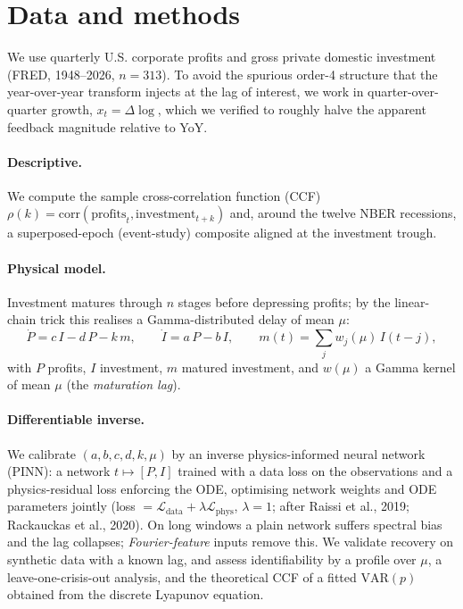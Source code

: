 \documentclass[11pt]{article}
\begin{document}
\section{Data and methods}
We use quarterly U.S. corporate profits and gross private domestic investment (FRED, 1948--2026,
$n=313$). To avoid the spurious order-4 structure that the year-over-year transform injects at the
lag of interest, we work in quarter-over-quarter growth, $x_t=\Delta\log$, which we verified to
roughly halve the apparent feedback magnitude relative to YoY.

\paragraph{Descriptive.} We compute the sample cross-correlation function (CCF)
$\rho(k)=\mathrm{corr}(\text{profits}_t,\text{investment}_{t+k})$ and, around the twelve NBER
recessions, a superposed-epoch (event-study) composite aligned at the investment trough.

\paragraph{Physical model.} Investment matures through $n$ stages before depressing profits; by
the linear-chain trick this realises a Gamma-distributed delay of mean $\mu$:
\begin{equation}
\dot P = c\,I - d\,P - k\,m,\qquad
\dot I = a\,P - b\,I,\qquad
m(t)=\textstyle\sum_j w_j(\mu)\,I(t-j),
\end{equation}
with $P$ profits, $I$ investment, $m$ matured investment, and $w(\mu)$ a Gamma kernel of mean
$\mu$ (the \emph{maturation lag}).

\paragraph{Differentiable inverse.} We calibrate $(a,b,c,d,k,\mu)$ by an inverse
physics-informed neural network (PINN): a network $t\mapsto[P,I]$ trained with a data loss on the
observations and a physics-residual loss enforcing the ODE, optimising network weights and ODE
parameters jointly (loss $=\mathcal L_{\text{data}}+\lambda\mathcal L_{\text{phys}}$, $\lambda=1$;
after Raissi et al., 2019; Rackauckas et al., 2020). On long windows a plain network suffers
spectral bias and the lag collapses; \emph{Fourier-feature} inputs remove this. We validate
recovery on synthetic data with a known lag, and assess identifiability by a profile over $\mu$,
a leave-one-crisis-out analysis, and the theoretical CCF of a fitted $\mathrm{VAR}(p)$ obtained
from the discrete Lyapunov equation.
\end{document}
